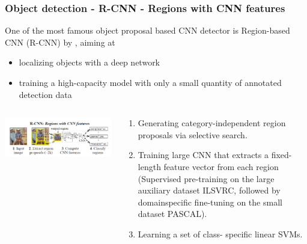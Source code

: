 \begin{frame}[allowframebreaks]
	\frametitle{Object detection - R-CNN - Regions with CNN features}



	One of the most famous object proposal based CNN detector is Region-based CNN (R-CNN) by \cite{girshick2014rich}, aiming at
	\begin{itemize}
		\item localizing objects with  a  deep  network
		\item training  a  high-capacity  model with only a small quantity of annotated detection data
	\end{itemize}



\begin{columns} %

	\begin{column}{.5\textwidth}
		\begin{center}
		\includegraphics[scale=0.6]{figs/RCNN_structure}
	\end{center}
	\end{column}%



	\begin{column}{.4\textwidth}
	\begin{enumerate}
		\item Generating category-independent region proposals via selective search.

		\item Training large CNN that extracts a fixed-length feature vector from each region (Supervised pre-training  on the large auxiliary dataset ILSVRC, followed by domainspecific   fine-tuning on the small dataset PASCAL).
		\item Learning a set of class-
		specific linear SVMs.
	\end{enumerate}
	\end{column}%
\end{columns}


\end{frame}
